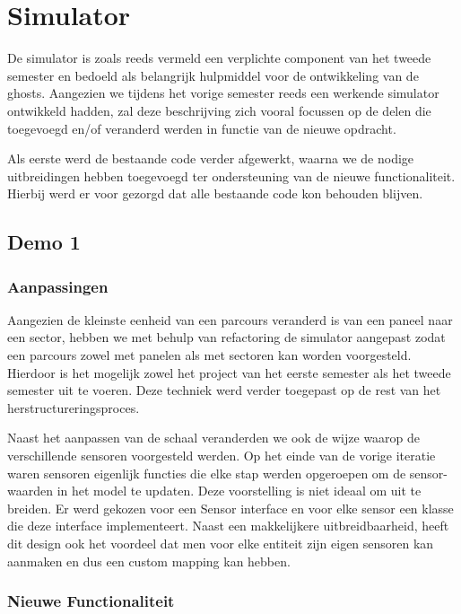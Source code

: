 \documentclass[12pt,a4paper]{report}
\begin{document}
\chapter{Simulator}

De simulator is zoals reeds vermeld een verplichte component van het tweede semester en bedoeld als belangrijk hulpmiddel voor de ontwikkeling van de ghosts. Aangezien we tijdens het vorige semester reeds een werkende simulator ontwikkeld hadden, zal deze beschrijving zich vooral focussen op de delen die toegevoegd en/of veranderd werden in functie van de nieuwe opdracht.

Als eerste werd de bestaande code verder afgewerkt, waarna we de nodige uitbreidingen hebben toegevoegd ter ondersteuning van de nieuwe functionaliteit. Hierbij werd er voor gezorgd dat alle bestaande code kon behouden blijven.

\section{Demo 1}

\subsection{Aanpassingen}

Aangezien de kleinste eenheid van een parcours veranderd is van een paneel naar een sector, hebben we met behulp van refactoring de simulator aangepast zodat een parcours zowel met panelen als met sectoren kan worden voorgesteld. Hierdoor is het mogelijk zowel het project van het eerste semester als het tweede semester uit te voeren. Deze techniek werd verder toegepast op de rest van het herstructureringsproces. 

Naast het aanpassen van de schaal veranderden we ook de wijze waarop de verschillende sensoren voorgesteld werden. Op het einde van de vorige iteratie waren sensoren eigenlijk functies die elke stap werden opgeroepen om de sensor-waarden in het model te updaten. Deze voorstelling is niet ideaal om uit te breiden. Er werd gekozen voor een Sensor interface en voor elke sensor een klasse die deze interface implementeert. Naast een makkelijkere uitbreidbaarheid, heeft dit design ook het voordeel dat men voor elke entiteit zijn eigen sensoren kan aanmaken en dus een custom mapping kan hebben.

\subsection{Nieuwe Functionaliteit}
\end{document}
